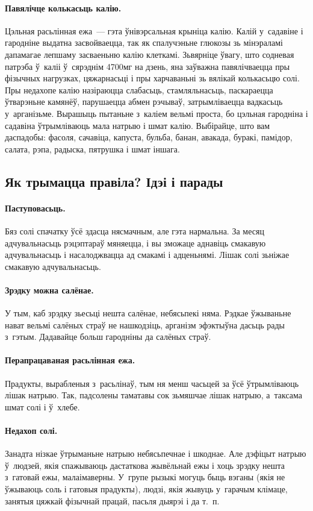\paragraph{Павялічце колькасьць калію.}
Цэльная расьлінная ежа~--- гэта ўнівэрсальная крыніца калію. Калій у~садавіне і гародніне выдатна засвойваецца, так як спалучэньне глюкозы зь мінэраламі дапамагае лепшаму засваеньню калію клеткамі. Зьвярніце ўвагу, што содневая патрэба ў~каліі ў~сярэднім 4700мг на дзень, яна заўважна павялічваецца пры фізычных нагрузках, цяжарнасьці і пры харчаваньні зь вялікай колькасьцю солі. Пры недахопе калію назіраюцца слабасьць, стамляльнасьць, паскараецца ўтварэньне камянёў, парушаецца абмен рэчываў, затрымліваецца вадкасьць у~арганізьме. Вырашыць пытаньне з~каліем вельмі проста, бо цэльная гародніна і садавіна ўтрымліваюць мала натрыю і шмат калію. Выбірайце, што вам даспадобы: фасоля, сачавіца, капуста, бульба, банан, авакада, буракі, памідор, салата, рэпа, радыска, пятрушка і шмат іншага.

\subsection{Як трымацца правіла? Ідэі і парады}

\paragraph{Паступовасьць.}
Бяз солі спачатку ўсё здасца нясмачным, але гэта нармальна. За месяц адчувальнасьць рэцэптараў мяняецца, і вы зможаце аднавіць смакавую адчувальнасьць і насалоджвацца ад смакамі і адценьнямі. Лішак солі зьніжае смакавую адчувальнасьць.

\paragraph{Зрэдку можна салёнае.}
У тым, каб зрэдку зьесьці нешта салёнае, небясьпекі няма. Рэдкае ўжываньне нават вельмі салёных страў не нашкодзіць, арганізм эфэктыўна дасьць рады з~гэтым. Дадавайце больш гародніны да салёных страў.

\paragraph{Перапрацаваная расьлінная ежа.}
Прадукты, вырабленыя з~расьлінаў, тым ня менш часьцей за ўсё ўтрымліваюць лішак натрыю. Так, падсолены таматавы сок зьмяшчае лішак натрыю, а~таксама шмат солі і ў~хлебе.

\paragraph{Недахоп солі.}
Занадта нізкае ўтрыманьне натрыю небясьпечнае і шкоднае. Але дэфіцыт натрыю ў~людзей, якія спажываюць дастаткова жывёльнай ежы і хоць зрэдку нешта з~гатовай ежы, малаімаверны. У~групе рызыкі могуць быць вэганы (якія не ўжываюць соль і гатовыя прадукты), людзі, якія жывуць у~гарачым клімаце, занятыя цяжкай фізычнай працай, пасьля дыярэі і да т.~п.

